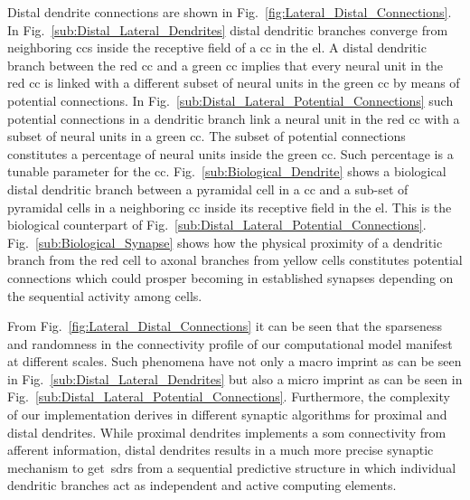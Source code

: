 \documentclass[10pt,journal,compsoc]{IEEEtran}
\begin{document}
Distal dendrite connections are shown in Fig.~\ref{fig:Lateral_Distal_Connections}. In Fig.~\ref{sub:Distal_Lateral_Dendrites} distal dendritic branches converge from neighboring \glspl{cc} inside the receptive field of a \gls{cc} in the \gls{el}. A distal dendritic branch between the red \gls{cc} and a green \gls{cc} implies that every neural unit in the red \gls{cc} is linked with a different subset of neural units in the green \gls{cc} by means of potential connections. In Fig.~\ref{sub:Distal_Lateral_Potential_Connections} such potential connections in a dendritic branch link a neural unit in the red \gls{cc} with a subset of neural units in a green \gls{cc}. The subset of potential connections constitutes a percentage of neural units inside the green \gls{cc}. Such percentage is a tunable parameter for the \gls{cc}. Fig.~\ref{sub:Biological_Dendrite} shows a biological distal dendritic branch between a pyramidal cell in a \gls{cc} and a sub-set of pyramidal cells in a neighboring \gls{cc} inside its receptive field in the \gls{el}. This is the biological counterpart of Fig.~\ref{sub:Distal_Lateral_Potential_Connections}. Fig.~\ref{sub:Biological_Synapse} shows how the physical proximity of a dendritic branch from the red cell to axonal branches from yellow cells constitutes potential connections which could prosper becoming in established synapses depending on the sequential activity among cells.

From Fig.~\ref{fig:Lateral_Distal_Connections} it can be seen that the sparseness and randomness in the connectivity profile of our computational model manifest at different scales. Such phenomena have not only a macro imprint as can be seen in Fig.~\ref{sub:Distal_Lateral_Dendrites} but also a micro imprint as can be seen in Fig.~\ref{sub:Distal_Lateral_Potential_Connections}. Furthermore, the complexity of our implementation derives in different synaptic algorithms for proximal and distal dendrites. While proximal dendrites implements a \gls{som} connectivity from afferent information, distal dendrites results in a much more precise synaptic mechanism to get~\glspl{sdr} from a sequential predictive structure in which individual dendritic branches act as independent and active computing elements.
\end{document}
